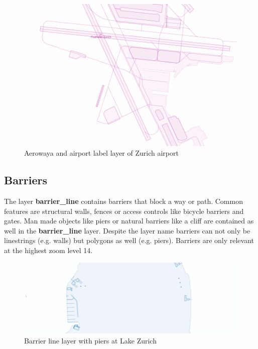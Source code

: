 \begin{figure}[H]
  \centering
  \includegraphics[width=1\textwidth]{images/schema/aeroway_example}
  \caption{Aerowaya and airport label layer of Zurich airport}
\end{figure}

\subsection{Barriers}

The layer \textbf{barrier\_line} contains barriers that block a way or path. Common features are structural walls, fences or access controls like bicycle barriers and gates. Man made objects like piers or natural barriers like a cliff are contained as well in the \textbf{barrier\_line} layer. Despite the layer name barriers can not only be linestrings (e.g. walls) but polygons as well (e.g. piers). Barriers are only relevant at the highest zoom level 14.

\begin{figure}[H]
  \centering
  \includegraphics[width=1\textwidth]{images/schema/piers_example}
  \caption{Barrier line layer with piers at Lake Zurich}
\end{figure}

